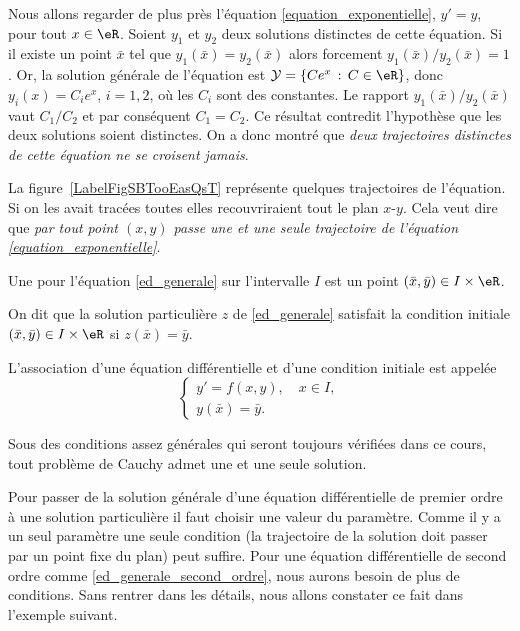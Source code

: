 \begin{example}
	Nous allons regarder de plus près l'équation \eqref{equation_exponentielle}, \( y'=y\), pour tout \( x\in\eR\). Soient \( y_1\) et \( y_2\) deux solutions distinctes de cette équation. Si il existe un point \( \bar x\) tel que \( y_1(\bar x) = y_2 (\bar x)\) alors forcement \( y_1(\bar x)/y_2 (\bar x)=1\). Or, la solution générale de l'équation est \(\mathcal{Y} = \{Ce^x\, : \, C\in\eR\}\), donc \( y_i(x) = C_ie^x\), \( i= 1,2\), o\`u les \( C_i\) sont des constantes. Le rapport \( y_1(\bar x)/y_2 (\bar x)\) vaut \( C_1/C_2\) et par conséquent \( C_1 = C_2\). Ce résultat contredit l'hypothèse que les deux solutions soient distinctes. On a donc montré que \emph{deux trajectoires distinctes de cette équation ne se croisent jamais}.

	\newcommand{\CaptionFigSBTooEasQsT}{Quelques trajectoires de l'équation \( y'=y\).}
	

	La figure~\ref{LabelFigSBTooEasQsT} représente quelques trajectoires de l'équation. Si on les avait tracées toutes elles recouvriraient tout le plan \( x\)-\( y\). Cela veut dire que \emph{par tout point \( (x,y)\) passe une et une seule trajectoire de l'équation \eqref{equation_exponentielle}}.

\end{example}
\begin{definition}
	Une  pour l'équation \eqref{ed_generale} sur l'intervalle \(I\) est un point \((\bar x, \bar y)\in I\times\eR\).

	On dit que la solution particulière \(z\) de \eqref{ed_generale} satisfait la condition initiale \((\bar x, \bar y)\in I\times\eR\) si \(z(\bar x) =\bar y\).
\end{definition}
\begin{definition}
	L'association d'une équation différentielle et d'une condition initiale est appelée 
	\begin{equation}\label{plme_cauchy}
		\begin{cases}
			y'= f(x,y), \quad x\in I, \\
			y(\bar x) = \bar y.
		\end{cases}
	\end{equation}
\end{definition}
\begin{remark}
	Sous des conditions assez générales qui seront toujours vérifiées dans ce cours, tout problème de Cauchy admet une et une seule solution.
\end{remark}
Pour passer de la solution générale d'une équation différentielle de premier ordre \`a une solution particulière il faut choisir une valeur du paramètre. Comme il y a un seul paramètre une seule condition (la trajectoire de la solution doit passer par un point fixe du plan) peut suffire. Pour une équation différentielle de second ordre comme \eqref{ed_generale_second_ordre}, nous aurons besoin de plus de conditions. Sans rentrer dans les détails, nous allons constater ce fait dans l'exemple suivant.

